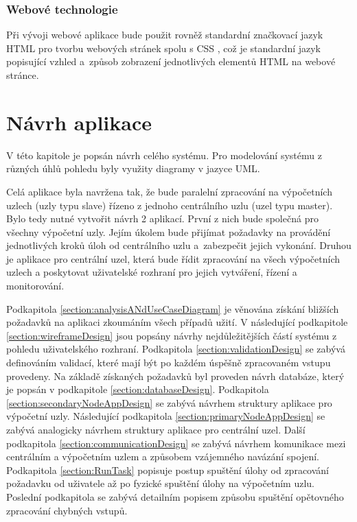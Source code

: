 \subsection*{Webové technologie}

Při vývoji webové aplikace bude použit rovněž standardní značkovací jazyk HTML \cite{Technology_HTML} pro tvorbu webových stránek spolu s CSS \cite{Technology_CSS}, což je standardní jazyk popisující vzhled a~způsob zobrazení jednotlivých elementů HTML na webové stránce.


\chapter{Návrh aplikace}
\label{chapter:application_design}

V této kapitole je popsán návrh celého systému. Pro modelování systému z různých úhlů pohledu byly využity diagramy v jazyce UML.

Celá aplikace byla navržena tak, že bude paralelní zpracování na výpočetních uzlech (uzly typu slave) řízeno z jednoho centrálního uzlu (uzel typu master). Bylo tedy nutné vytvořit návrh 2 aplikací. První z nich bude společná pro všechny výpočetní uzly. Jejím úkolem bude přijímat požadavky na provádění jednotlivých kroků úloh od centrálního uzlu a~zabezpečit jejich vykonání. Druhou je aplikace pro centrální uzel, která bude řídit zpracování na všech výpočetních uzlech a poskytovat uživatelské rozhraní pro jejich vytváření, řízení a monitorování.

Podkapitola \ref{section:analysisANdUseCaseDiagram} je věnována získání bližších požadavků na aplikaci zkoumáním všech případů užití. V následující podkapitole \ref{section:wireframeDesign} jsou popsány návrhy nejdůležitějších částí systému z pohledu uživatelského rozhraní. Podkapitola \ref{section:validationDesign} se zabývá definováním validací, které mají být po každém úspěšně zpracovaném vstupu provedeny. Na základě získaných požadavků byl proveden návrh databáze, který je popsán v podkapitole \ref{section:databaseDesign}. Podkapitola \ref{section:secondaryNodeAppDesign} se zabývá návrhem struktury aplikace pro výpočetní uzly. Následující podkapitola \ref{section:primaryNodeAppDesign} se zabývá analogicky návrhem struktury aplikace pro centrální uzel. Další podkapitola \ref{section:communicationDesign} se zabývá návrhem komunikace mezi centrálním a výpočetním uzlem a způsobem vzájemného navázání spojení. Podkapitola \ref{section:RunTask} popisuje postup spuštění úlohy od zpracování požadavku od uživatele až po fyzické spuštění úlohy na výpočetním uzlu. Poslední podkapitola se zabývá detailním popisem způsobu spuštění opětovného zpracování chybných vstupů.

